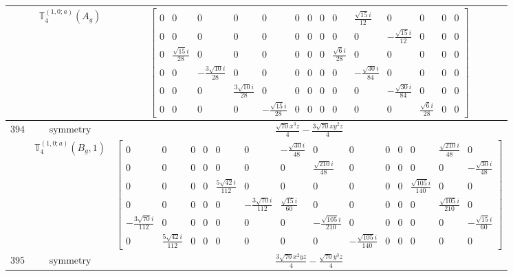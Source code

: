 \documentclass[fleqn,8pt,landscape]{jsarticle}
\begin{document}
\begin{longtable}{ccc}
$  $ & $ \mathbb{T}_{4}^{(1,0;a)}(A_{g}) $ & $ \begin{bmatrix} 0 & 0 & 0 & 0 & 0 & 0 & 0 & 0 & 0 & \frac{\sqrt{15} i}{12} & 0 & 0 & 0 & 0 \\ 0 & 0 & 0 & 0 & 0 & 0 & 0 & 0 & 0 & 0 & - \frac{\sqrt{15} i}{12} & 0 & 0 & 0 \\ 0 & \frac{\sqrt{15} i}{28} & 0 & 0 & 0 & 0 & 0 & 0 & \frac{\sqrt{6} i}{28} & 0 & 0 & 0 & 0 & 0 \\ 0 & 0 & - \frac{3 \sqrt{10} i}{28} & 0 & 0 & 0 & 0 & 0 & 0 & - \frac{\sqrt{30} i}{84} & 0 & 0 & 0 & 0 \\ 0 & 0 & 0 & \frac{3 \sqrt{10} i}{28} & 0 & 0 & 0 & 0 & 0 & 0 & - \frac{\sqrt{30} i}{84} & 0 & 0 & 0 \\ 0 & 0 & 0 & 0 & - \frac{\sqrt{15} i}{28} & 0 & 0 & 0 & 0 & 0 & 0 & \frac{\sqrt{6} i}{28} & 0 & 0 \end{bmatrix} $ \\ \hline
$ 394 $ & $ \text{symmetry} $ & $ \frac{\sqrt{70} x^{3} z}{4} - \frac{3 \sqrt{70} x y^{2} z}{4} $ \\
$  $ & $ \mathbb{T}_{4}^{(1,0;a)}(B_{g},1) $ & $ \begin{bmatrix} 0 & 0 & 0 & 0 & 0 & 0 & - \frac{\sqrt{30} i}{48} & 0 & 0 & 0 & 0 & 0 & \frac{\sqrt{210} i}{48} & 0 \\ 0 & 0 & 0 & 0 & 0 & 0 & 0 & \frac{\sqrt{210} i}{48} & 0 & 0 & 0 & 0 & 0 & - \frac{\sqrt{30} i}{48} \\ 0 & 0 & 0 & 0 & \frac{5 \sqrt{42} i}{112} & 0 & 0 & 0 & 0 & 0 & 0 & \frac{\sqrt{105} i}{140} & 0 & 0 \\ 0 & 0 & 0 & 0 & 0 & - \frac{3 \sqrt{70} i}{112} & \frac{\sqrt{15} i}{60} & 0 & 0 & 0 & 0 & 0 & \frac{\sqrt{105} i}{210} & 0 \\ - \frac{3 \sqrt{70} i}{112} & 0 & 0 & 0 & 0 & 0 & 0 & - \frac{\sqrt{105} i}{210} & 0 & 0 & 0 & 0 & 0 & - \frac{\sqrt{15} i}{60} \\ 0 & \frac{5 \sqrt{42} i}{112} & 0 & 0 & 0 & 0 & 0 & 0 & - \frac{\sqrt{105} i}{140} & 0 & 0 & 0 & 0 & 0 \end{bmatrix} $ \\ \hline
$ 395 $ & $ \text{symmetry} $ & $ \frac{3 \sqrt{70} x^{2} y z}{4} - \frac{\sqrt{70} y^{3} z}{4} $ \\

\end{longtable}
\end{document}
